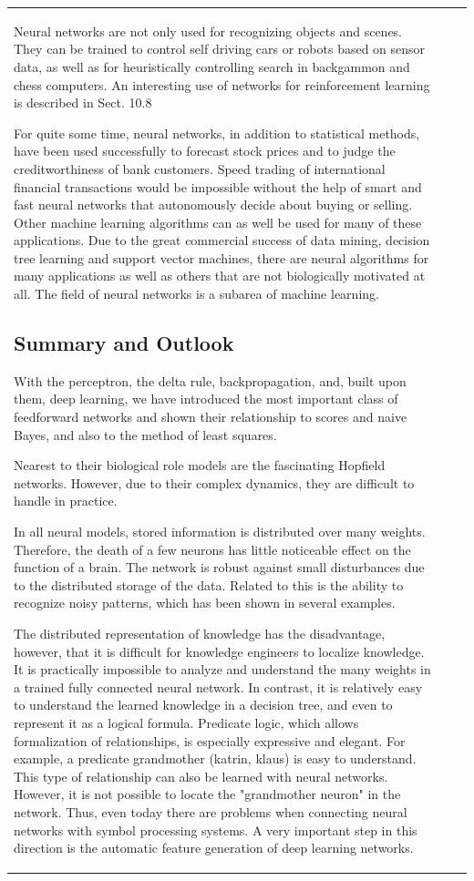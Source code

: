 \documentclass[10pt]{book}
\begin{document}
\begin{center}
\begin{tabular}{|l|l|l|}
Neural networks are not only used for recognizing objects and scenes. They can be trained to control self driving cars or robots based on sensor data, as well as for heuristically controlling search in backgammon and chess computers. An interesting use of networks for reinforcement learning is described in Sect. 10.8

For quite some time, neural networks, in addition to statistical methods, have been used successfully to forecast stock prices and to judge the creditworthiness of bank customers. Speed trading of international financial transactions would be impossible without the help of smart and fast neural networks that autonomously decide about buying or selling.
Other machine learning algorithms can as well be used for many of these applications. Due to the great commercial success of data mining, decision tree learning and support vector machines, there are neural algorithms for many applications as well as others that are not biologically motivated at all. The field of neural networks is a subarea of machine learning.

\subsection{Summary and Outlook}
With the perceptron, the delta rule, backpropagation, and, built upon them, deep learning, we have introduced the most important class of feedforward networks and shown their relationship to scores and naive Bayes, and also to the method of least squares.

Nearest to their biological role models are the fascinating Hopfield networks. However, due to their complex dynamics, they are difficult to handle in practice.

In all neural models, stored information is distributed over many weights. Therefore, the death of a few neurons has little noticeable effect on the function of a brain. The network is robust against small disturbances due to the distributed storage of the data. Related to this is the ability to recognize noisy patterns, which has been shown in several examples.

The distributed representation of knowledge has the disadvantage, however, that it is difficult for knowledge engineers to localize knowledge. It is practically impossible to analyze and understand the many weights in a trained fully connected neural network. In contrast, it is relatively easy to understand the learned knowledge in a decision tree, and even to represent it as a logical formula. Predicate logic, which allows formalization of relationships, is especially expressive and elegant. For example, a predicate grandmother (katrin, klaus) is easy to understand. This type of relationship can also be learned with neural networks. However, it is not possible to locate the "grandmother neuron" in the network. Thus, even today there are problems when connecting neural networks with symbol processing systems. A very important step in this direction is the automatic feature generation of deep learning networks.


\end{tabular}
\end{center}
\end{document}
